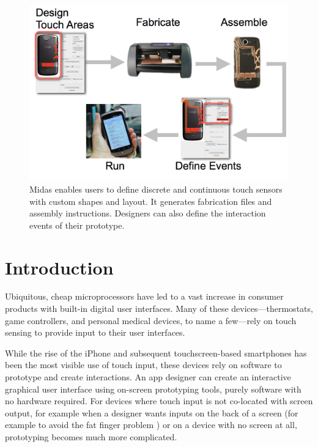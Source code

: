 \begin{figure}
\centering
\includegraphics[width=\textwidth]{figures/midas/overview.png}
\caption{Midas enables users to define discrete and continuous touch sensors with custom shapes and layout. It generates fabrication files and assembly instructions. Designers can also define the interaction events of their prototype.}
\label{fig:midas-overview}
\end{figure}

\section{Introduction}


Ubiquitous, cheap microprocessors have led to a vast increase in consumer products with built-in digital user interfaces. Many of these devices---thermostats, game controllers, and personal medical devices, to name a few---rely on touch sensing to provide input to their user interfaces.

While the rise of the iPhone and subsequent touchscreen-based smartphones has been the most visible use of touch input, these devices rely on software to prototype and create interactions. An app designer can create an interactive graphical user interface using on-screen prototyping tools, purely software with no hardware required. For devices where touch input is not co-located with screen output, for example when a designer wants inputs on the back of a screen (for example to avoid the fat finger problem \cite{baudisch-nanotouch}) or on a device with no screen at all, prototyping becomes much more complicated.

